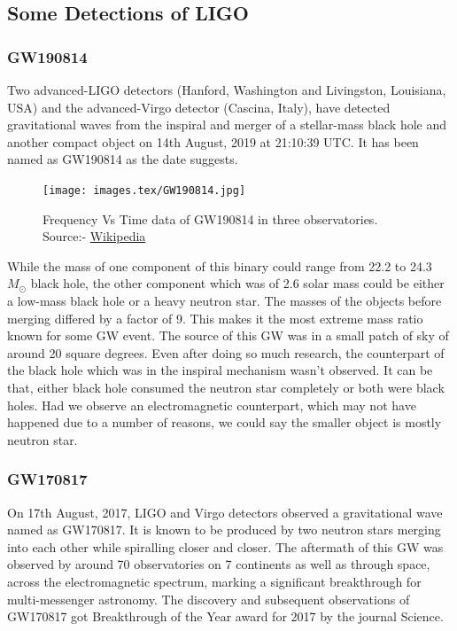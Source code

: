\subsection{Some Detections of LIGO}

\subsubsection{GW190814}

Two advanced-LIGO detectors (Hanford, Washington and Livingston, Louisiana, USA) and the advanced-Virgo detector (Cascina, Italy), have detected gravitational waves from the inspiral and merger of a stellar-mass black hole and another compact object on 14th August, 2019 at 21:10:39 UTC. It has been named as GW190814 as the date suggests.

\begin{figure}[h]
    \centering
    \texttt{[image: images.tex/GW190814.jpg]}
    \caption{Frequency Vs Time data of GW190814 in three observatories. Source:- \href{https://en.wikipedia.org/wiki/GW190814}{Wikipedia}}
\end{figure}

While the mass of one component of this binary could range from 22.2 to 24.3 $M_\odot$ black hole, the other component which was of 2.6 solar mass could be either a low-mass black hole or a heavy neutron star. The masses of the objects before merging differed by a factor of 9. This makes it the most extreme mass ratio known for some GW event. The source of this GW was in a small patch of sky of around 20 square degrees. Even after doing so much research, the counterpart of the black hole which was in the inspiral mechanism wasn’t observed. It can be that, either black hole consumed the neutron star completely or both were black holes. Had we observe an electromagnetic counterpart, which may not have happened due to a number of reasons, we could say the smaller object is mostly neutron star. 

\pagebreak

\subsubsection{GW170817}

On 17th August, 2017, LIGO and Virgo detectors observed a gravitational wave named as GW170817. It is known to be produced by two neutron stars merging into each other while spiralling closer and closer. The aftermath of this GW was observed by around 70 observatories on 7 continents as well as through space, across the electromagnetic spectrum, marking a significant breakthrough for multi-messenger astronomy. The discovery and subsequent observations of GW170817 got Breakthrough of the Year award for 2017 by the journal Science.

